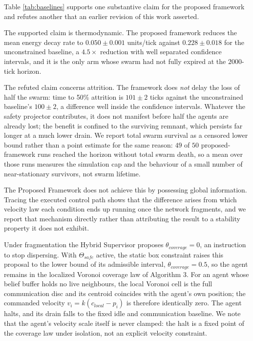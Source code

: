 \documentclass[conference]{IEEEtran}
\begin{document}
Table \ref{tab:baselines} supports one substantive claim for the proposed framework and refutes another that an earlier revision of this work asserted.

The supported claim is thermodynamic. The proposed framework reduces the mean energy decay rate to $0.050 \pm 0.001$ units/tick against $0.228 \pm 0.018$ for the unconstrained baseline, a $4.5\times$ reduction with well separated confidence intervals, and it is the only arm whose swarm had not fully expired at the $2000$-tick horizon.

The refuted claim concerns attrition. The framework does \emph{not} delay the loss of half the swarm: time to 50\% attrition is $101 \pm 2$ ticks against the unconstrained baseline's $100 \pm 2$, a difference well inside the confidence intervals. Whatever the safety projector contributes, it does not manifest before half the agents are already lost; the benefit is confined to the surviving remnant, which persists far longer at a much lower drain. We report total swarm survival as a censored lower bound rather than a point estimate for the same reason: $49$ of $50$ proposed-framework runs reached the horizon without total swarm death, so a mean over those runs measures the simulation cap and the behaviour of a small number of near-stationary survivors, not swarm lifetime.

The Proposed Framework does not achieve this by possessing global information. Tracing the executed control path shows that the difference arises from which velocity law each condition ends up running once the network fragments, and we report that mechanism directly rather than attributing the result to a stability property it does not exhibit.

Under fragmentation the Hybrid Supervisor proposes $\theta_{coverage} = 0$, an instruction to stop dispersing. With $\Theta_{safe}$ active, the static box constraint raises this proposal to the lower bound of its admissible interval, $\theta_{coverage} = 0.5$, so the agent remains in the localized Voronoi coverage law of Algorithm 3. For an agent whose belief buffer holds no live neighbours, the local Voronoi cell is the full communication disc and its centroid coincides with the agent's own position; the commanded velocity $v_i = k(c_{local} - p_i)$ is therefore identically zero. The agent halts, and its drain falls to the fixed idle and communication baseline. We note that the agent's velocity scale itself is never clamped: the halt is a fixed point of the coverage law under isolation, not an explicit velocity constraint.
\end{document}
